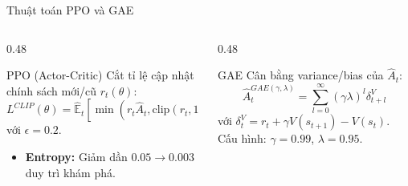 \documentclass[aspectratio=169]{beamer}
\begin{document}
\begin{frame}{Thuật toán PPO và GAE}
  \begin{columns}[T]
    \begin{column}{0.48\textwidth}
      \begin{block}{PPO (Actor-Critic)}
        Cắt tỉ lệ cập nhật chính sách mới/cũ $r_t(\theta)$:
        \scriptsize
        $$L^{CLIP}(\theta) = \hat{\mathbb{E}}_t\left[\min\left(r_t\hat{A}_t, \text{clip}(r_t, 1\pm\epsilon)\hat{A}_t\right)\right]$$
        \small
        với $\epsilon = 0.2$.
        \begin{itemize}
          \item \textbf{Entropy:} Giảm dần $0.05 \to 0.003$ duy trì khám phá.
        \end{itemize}
      \end{block}
    \end{column}
    \begin{column}{0.48\textwidth}
      \begin{block}{GAE}
        Cân bằng variance/bias của $\hat{A}_t$:
        \scriptsize
        $$\hat{A}_t^{GAE(\gamma,\lambda)} = \sum_{l=0}^{\infty}(\gamma\lambda)^l \delta_{t+l}^V$$
        với $\delta_t^V = r_t + \gamma V(s_{t+1}) - V(s_t)$.
        \small
        Cấu hình: $\gamma = 0.99$, $\lambda = 0.95$.
      \end{block}
    \end{column}
  \end{columns}
\end{frame}
\end{document}
